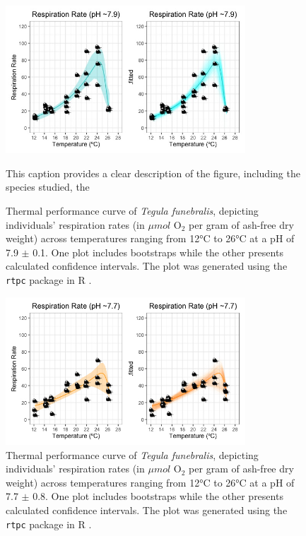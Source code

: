 \documentclass[
]{article}
\begin{document}
\begin{figure}[htbp]
  \centering
  \includegraphics[width=0.8\textwidth]{Images/schoolfield-high.jpg}
  \caption{Thermal performance curve of \textit{Tegula funebralis}, depicting individuals' respiration rates (in $\mu mol$ O$_2$ per gram of ash-free dry weight) across temperatures ranging from 12°C to 26°C at a pH of 7.9 $\pm$ 0.1. One plot includes bootstraps while the other presents calculated confidence intervals. The plot was generated using the \texttt{rtpc} package in R \citep{padfield2021rtpc}.}
This caption provides a clear description of the figure, including the species studied, the 
  \label{fig:tpc-schoolfield-high}
\end{figure}

\begin{figure}[htbp]
  \centering
  \includegraphics[width=0.8\textwidth]{Images/schoolfield-low.jpg}
  \caption{Thermal performance curve of \textit{Tegula funebralis}, depicting individuals' respiration rates (in $\mu mol$ O$_2$ per gram of ash-free dry weight) across temperatures ranging from 12°C to 26°C at a pH of 7.7 $\pm$ 0.8. One plot includes bootstraps while the other presents calculated confidence intervals. The plot was generated using the \texttt{rtpc} package in R \citep{padfield2021rtpc}.}
  \label{fig:tpc-schoolfield-low}
\end{figure}
\end{document}
